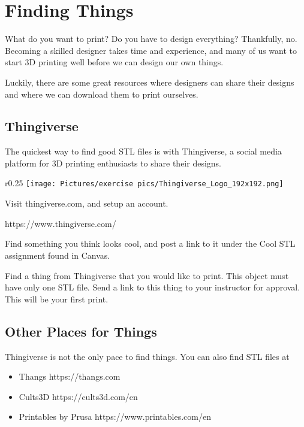 
\section{Finding Things}

What do you want to print? Do you have to design everything? Thankfully, no. Becoming a skilled designer takes time and experience, and many of us want to start 3D printing well before we can design our own things.

\noindent Luckily, there are some great resources where designers can share their designs and where we can download them to print ourselves.

\subsection{Thingiverse}

The quickest way to find good STL files is with Thingiverse, a social media platform for 3D printing enthusiasts to share their designs.

\begin{wrapfigure}{r}{0.25\textwidth} %
    \centering
   \texttt{[image: Pictures/exercise pics/Thingiverse\_Logo\_192x192.png]}
    \label{fig:prusai3}
\end{wrapfigure}


\begin{exercise}
Visit thingiverse.com, and setup an account.
\end{exercise}
{\footnotesize https://www.thingiverse.com/}

\begin{exercise}
Find something you think looks cool, and post a link to it under the Cool STL assignment found in Canvas.
\end{exercise}

\begin{exercise}
Find a thing from Thingiverse that you would like to print. This object must have only one STL file. Send a link to this thing to your instructor for approval. This will be your first print.
\end{exercise}

\subsection{Other Places for Things}

Thingiverse is not the only pace to find things. You can also find STL files at

\begin{itemize}
    \item Thangs {\footnotesize https://thangs.com}
    \item Cults3D {\footnotesize https://cults3d.com/en}
    \item Printables by Prusa {\footnotesize https://www.printables.com/en}
\end{itemize}

